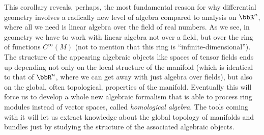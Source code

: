 \begin{rem}
    This corollary reveals, perhaps, the most fundamental reason for why differential geometry involves a radically new level of algebra compared to analysis on $\bbR^n$, where all we need is linear algebra over the field of real numbers. As we see, in geometry we have to work with linear algebra not over a field, but over the ring of functions $C^\infty(M)$ (not to mention that this ring is ``infinite-dimensional''). The structure of the appearing algebraic objects like spaces of tensor fields ends up depending not only on the local structure of the manifold (which is identical to that of $\bbR^n$, where we can get away with just algebra over fields), but also on the global, often topological, properties of the manifold. Eventually this will force us to develop a whole new algebraic formalism that is able to process ring modules instead of vector spaces, called \emph{homological algebra}. The tools coming with it will let us extract knowledge about the global topology of manifolds and bundles just by studying the structure of the associated algebraic objects.
\end{rem}


